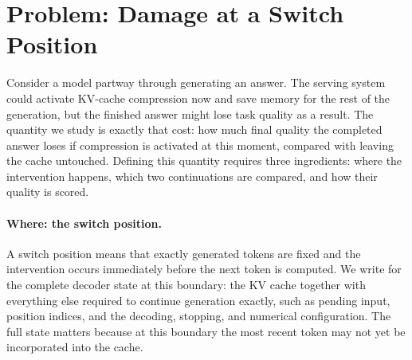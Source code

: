 \section{Problem: Damage at a Switch Position}

Consider a model partway through generating an answer. The serving system
could activate KV-cache compression now and save memory for the rest of the
generation, but the finished answer might lose task quality as a result. The
quantity we study is exactly that cost: how much final quality the completed
answer loses if compression is activated at this moment, compared with
leaving the cache untouched. Defining this quantity requires three
ingredients: where the intervention happens, which two continuations are
compared, and how their quality is scored.

\paragraph{Where: the switch position.}
A switch position \switchpos{} means that exactly \switchpos{} generated
tokens are fixed and the intervention occurs immediately before the next
token is computed. We write \decoderstate{} for the complete decoder state at
this boundary: the KV cache together with everything else required to
continue generation exactly, such as pending input, position indices, and the
decoding, stopping, and numerical configuration. The full state matters
because at this boundary the most recent token may not yet be incorporated
into the cache.

